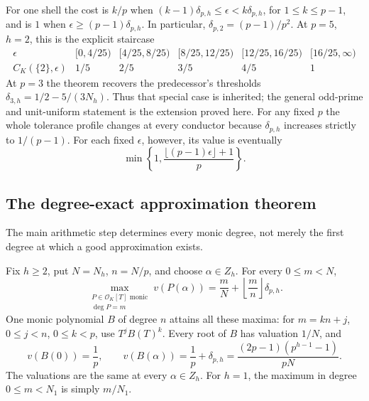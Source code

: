 For one shell the cost is $k/p$ when
$(k-1)\delta_{p,h}\le\epsilon<k\delta_{p,h}$, for
$1\le k\le p-1$, and is $1$ when
$\epsilon\ge(p-1)\delta_{p,h}$. In particular,
$\delta_{p,2}=(p-1)/p^2$. At $p=5$, $h=2$, this is the explicit staircase
\[
\begin{array}{c|ccccc}
\epsilon &[0,4/25)&[4/25,8/25)&[8/25,12/25)&[12/25,16/25)&[16/25,\infty)\\\hline
C_K(\{2\},\epsilon)&1/5&2/5&3/5&4/5&1
\end{array}
\]
At $p=3$ the theorem recovers the predecessor's thresholds
$\delta_{3,h}=1/2-5/(3N_h)$. Thus that special case is inherited;
the general odd-prime and unit-uniform statement is the extension proved
here. For any fixed $p$ the whole tolerance profile changes at every
conductor because $\delta_{p,h}$ increases strictly to $1/(p-1)$.
For each fixed $\epsilon$, however, its value is eventually
\[
 \min\left\{1,\frac{\lfloor(p-1)\epsilon\rfloor+1}{p}\right\}.
\]

\subsection{The degree-exact approximation theorem}
The main arithmetic step determines every monic degree, not merely the
first degree at which a good approximation exists.

\begin{theorem}\label{thm:false-tate-approx}
Fix $h\ge2$, put $N=N_h$, $n=N/p$, and choose $\alpha\in Z_h$.
For every $0\le m<N$,
\begin{equation}\label{eq:false-tate-approx}
 \max_{\substack{P\in\mathcal O_K[T]\text{ monic}\\\deg P=m}}
 v(P(\alpha))
 =\frac mN+\left\lfloor\frac mn\right\rfloor\delta_{p,h}.
\end{equation}
One monic polynomial $B$ of degree $n$ attains all these maxima:
for $m=kn+j$, $0\le j<n$, $0\le k<p$, use $T^jB(T)^k$.
Every root of $B$ has valuation $1/N$, and
\[
 v(B(0))=\frac1p,\qquad
 v(B(\alpha))=\frac1p+\delta_{p,h}
 =\frac{(2p-1)(p^{h-1}-1)}{pN}.
\]
The valuations are the same at every $\alpha\in Z_h$.
For $h=1$, the maximum in degree $0\le m<N_1$ is simply $m/N_1$.
\end{theorem}

